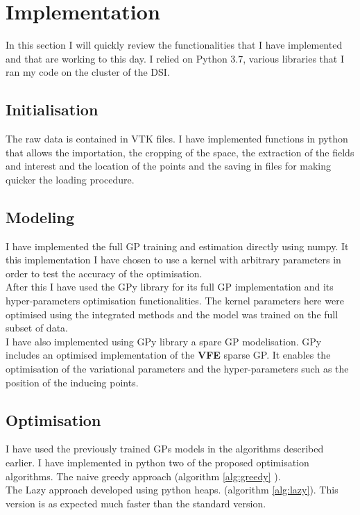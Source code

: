 \section{Implementation}

In this section I will quickly review the functionalities that I have implemented and that are working to this day. I relied on Python 3.7, various libraries that I ran my code on the cluster of the DSI.  \\

\subsection{Initialisation}
The raw data is contained in VTK files. I have implemented functions in python that allows the importation, the cropping of the space, the extraction of the fields and interest and the location of the points and the saving in files for making quicker the loading procedure. 

\subsection{Modeling}

I have implemented the full GP training and estimation directly using numpy. It this implementation I have chosen to use a kernel with arbitrary parameters in order to test the accuracy of the optimisation. \\

After this I have used the GPy library \citep{gpy_gpy:_2014} for its full GP implementation and its hyper-parameters optimisation functionalities. The kernel parameters here were optimised using the integrated methods and the model was trained on the full subset of data. \\

I have also implemented using GPy library a spare GP modelisation. GPy includes an optimised implementation of the \textbf{VFE} sparse GP. It enables the optimisation of the variational parameters and the hyper-parameters such as the position of the inducing points. 

\subsection{Optimisation}

I have used the previously trained GPs models in the algorithms described earlier. I have implemented in python two of the proposed optimisation algorithms. The naive greedy approach (algorithm \ref{alg:greedy} ). \\
The Lazy approach developed using python heaps. (algorithm \ref{alg:lazy}). This version is as expected much faster than the standard version.  \\ 

